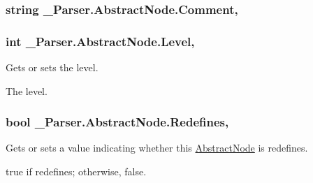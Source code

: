 \subsubsection[{\texorpdfstring{Comment}{Comment}}]{\setlength{\rightskip}{0pt plus 5cm}string \+\_\+Parser.\+Abstract\+Node.\+Comment\hspace{0.3cm}{\ttfamily [get]}, {}}\hypertarget{class__1920_parser_1_1_abstract_node_aff4df7a21266685abdac7a455a0f7ac8}{}\label{class__1920_parser_1_1_abstract_node_aff4df7a21266685abdac7a455a0f7ac8}
\subsubsection[{\texorpdfstring{Level}{Level}}]{\setlength{\rightskip}{0pt plus 5cm}int \+\_\+Parser.\+Abstract\+Node.\+Level\hspace{0.3cm}{\ttfamily [get]}, {}}\hypertarget{class__1920_parser_1_1_abstract_node_a08c3c1dccbd57a5ddf4c6f2144223dc6}{}\label{class__1920_parser_1_1_abstract_node_a08c3c1dccbd57a5ddf4c6f2144223dc6}


Gets or sets the level. 

The level. 
\subsubsection[{\texorpdfstring{Redefines}{Redefines}}]{\setlength{\rightskip}{0pt plus 5cm}bool \+\_\+Parser.\+Abstract\+Node.\+Redefines\hspace{0.3cm}{\ttfamily [get]}, {}}\hypertarget{class__1920_parser_1_1_abstract_node_a66fd8845fa232c78f396f15467e17458}{}\label{class__1920_parser_1_1_abstract_node_a66fd8845fa232c78f396f15467e17458}


Gets or sets a value indicating whether this \hyperlink{class__1920_parser_1_1_abstract_node}{Abstract\+Node} is redefines. 

{\ttfamily true} if redefines; otherwise, {\ttfamily false}. 
